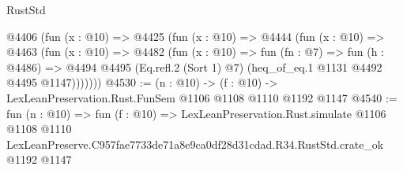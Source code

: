 \begin{lexlean}{RustStd}
\begin{coremodule}
    @4406
      (fun (x : @10) =>
      @4425
        (fun (x : @10) =>
        @4444
          (fun (x : @10) =>
          @4463
            (fun (x : @10) =>
            @4482
              (fun (x : @10) =>
              fun (fn : @7) =>
              fun (h : @4486) =>
              @4494 @4495 (Eq.refl.{2} (Sort 1) @7) (heq_of_eq.{1} @1131 @4492 @4495 @1147)))))))
@4530 := (n : @10) -> (f : @10) -> LexLeanPreservation.Rust.FunSem @1106 @1108 @1110 @1192 @1147
@4540 := fun (n : @10) =>
  fun (f : @10) =>
  LexLeanPreservation.Rust.simulate
    @1106
    @1108
    @1110
    LexLeanPreserve.C957fae7733de71a8e9ca0df28d31cdad.R34.RustStd.crate_ok
    @1192
    @1147
\end{coremodule}
\end{lexlean}
